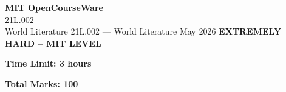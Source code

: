 \documentclass[12pt,a4paper]{exam}
\begin{document}
\begin{center}
{\LARGE \textbf{MIT OpenCourseWare}}\\21L.002\\World Literature
\vspace{0.5cm}
{21L.002} --- {World Literature}
\vspace{0.3cm}
May 2026
\vspace{0.3cm}
\textbf{EXTREMELY HARD -- MIT LEVEL}
\end{center}

\begin{center}
\textbf{Time Limit: 3 hours}
\end{center}

\begin{center}
\textbf{Total Marks: 100}
\end{center}

\vspace{0.5cm}
\end{document}
